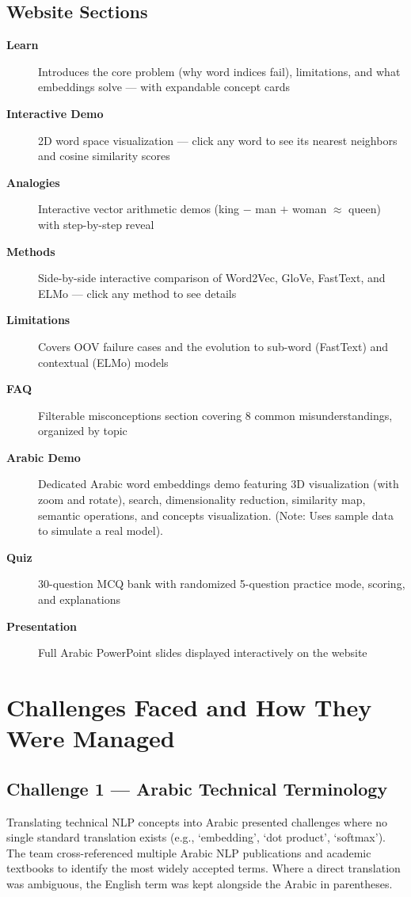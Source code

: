 \subsection{Website Sections}
\begin{description}
    \item[\textbf{Learn}] Introduces the core problem (why word indices fail), limitations, and what embeddings solve — with expandable concept cards
    \item[\textbf{Interactive Demo}] 2D word space visualization — click any word to see its nearest neighbors and cosine similarity scores
    \item[\textbf{Analogies}] Interactive vector arithmetic demos (king $-$ man $+$ woman $\approx$ queen) with step-by-step reveal
    \item[\textbf{Methods}] Side-by-side interactive comparison of Word2Vec, GloVe, FastText, and ELMo — click any method to see details
    \item[\textbf{Limitations}] Covers OOV failure cases and the evolution to sub-word (FastText) and contextual (ELMo) models
    \item[\textbf{FAQ}] Filterable misconceptions section covering 8 common misunderstandings, organized by topic
    \item[\textbf{Arabic Demo}] Dedicated Arabic word embeddings demo featuring 3D visualization (with zoom and rotate), search, dimensionality reduction, similarity map, semantic operations, and concepts visualization. (Note: Uses sample data to simulate a real model).
    \item[\textbf{Quiz}] 30-question MCQ bank with randomized 5-question practice mode, scoring, and explanations
    \item[\textbf{Presentation}] Full Arabic PowerPoint slides displayed interactively on the website
\end{description}

\section{Challenges Faced and How They Were Managed}

\subsection{Challenge 1 — Arabic Technical Terminology}
Translating technical NLP concepts into Arabic presented challenges where no single standard translation exists (e.g., `embedding', `dot product', `softmax'). The team cross-referenced multiple Arabic NLP publications and academic textbooks to identify the most widely accepted terms. Where a direct translation was ambiguous, the English term was kept alongside the Arabic in parentheses.

